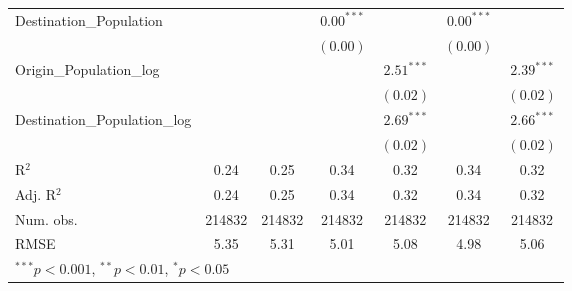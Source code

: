 \begin{table}
\begin{center}
\begin{tabular}{l c c c c c c }
			Destination\_Population      &               &               & $0.00^{***}$  &                & $0.00^{***}$  &                \\
			&               &               & $(0.00)$      &                & $(0.00)$      &                \\
			Origin\_Population\_log      &               &               &               & $2.51^{***}$   &               & $2.39^{***}$   \\
			&               &               &               & $(0.02)$       &               & $(0.02)$       \\
			Destination\_Population\_log &               &               &               & $2.69^{***}$   &               & $2.66^{***}$   \\
			&               &               &               & $(0.02)$       &               & $(0.02)$       \\
			\hline
			R$^2$                        & 0.24          & 0.25          & 0.34          & 0.32           & 0.34          & 0.32           \\
			Adj. R$^2$                   & 0.24          & 0.25          & 0.34          & 0.32           & 0.34          & 0.32           \\
			Num. obs.                    & 214832        & 214832        & 214832        & 214832         & 214832        & 214832         \\
			RMSE                         & 5.35          & 5.31          & 5.01          & 5.08           & 4.98          & 5.06           \\
			\hline
			\multicolumn{7}{l}{\scriptsize{$^{***}p<0.001$, $^{**}p<0.01$, $^*p<0.05$}}
		\end{tabular}
		\label{table:GravityModel2015Q1}
	\end{center}
\end{table}

